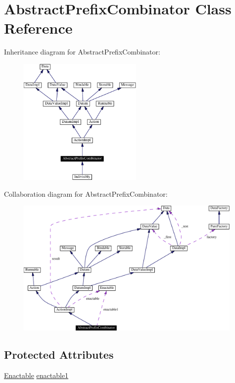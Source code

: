 \hypertarget{classAbstractPrefixCombinator}{
\section{Abstract\-Prefix\-Combinator  Class Reference}
\label{classAbstractPrefixCombinator}
}
Inheritance diagram for Abstract\-Prefix\-Combinator:\begin{figure}[H]
\begin{center}
\leavevmode
\includegraphics[width=170pt]{classAbstractPrefixCombinator__inherit__graph}
\end{center}
\end{figure}
Collaboration diagram for Abstract\-Prefix\-Combinator:\begin{figure}[H]
\begin{center}
\leavevmode
\includegraphics[width=312pt]{classAbstractPrefixCombinator__coll__graph}
\end{center}
\end{figure}
\subsection*{Protected Attributes}
\begin{CompactItemize}
\item 
\hyperlink{interfaceEnactable}{Enactable} \hyperlink{classAbstractPrefixCombinator_n0}{enactable1}
\end{CompactItemize}


